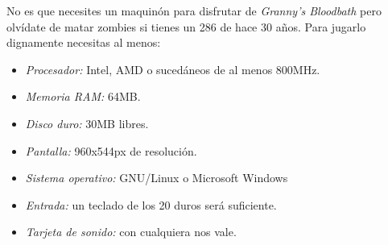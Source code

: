 No es que necesites un maquinón para disfrutar de \emph{Granny's Bloodbath} pero olvídate de matar zombies si tienes un 286 de hace 30 años. Para jugarlo dignamente necesitas al menos:

\begin{itemize}
	\item \emph{Procesador:} Intel, AMD o sucedáneos de al menos 800MHz.
	\item \emph{Memoria RAM:} 64MB.
	\item \emph{Disco duro:} 30MB libres.
	\item \emph{Pantalla:} 960x544px de resolución.
	\item \emph{Sistema operativo:} GNU/Linux o Microsoft Windows
	\item \emph{Entrada:} un teclado de los 20 duros será suficiente.
	\item \emph{Tarjeta de sonido:} con cualquiera nos vale.
\end{itemize}
